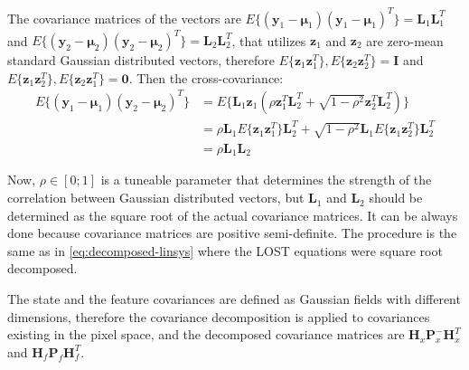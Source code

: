The covariance matrices of the vectors are $E\{(\mathbf{y}_1-\boldsymbol{\mu}_1)(\mathbf{y}_1-\boldsymbol{\mu}_1)^T\}=\mathbf{L}_1\mathbf{L}_1^T$ and $E\{(\mathbf{y}_2-\boldsymbol{\mu}_2)(\mathbf{y}_2-\boldsymbol{\mu}_2)^T\}=\mathbf{L}_2\mathbf{L}_2^T$, that utilizes $\mathbf{z}_1$ and $\mathbf{z}_2$ are zero-mean standard Gaussian distributed vectors, therefore $E\{\mathbf{z}_1\mathbf{z}_1^T\}, E\{\mathbf{z}_2\mathbf{z}_2^T\}=\mathbf{I}$ and $E\{\mathbf{z}_1\mathbf{z}_2^T\}, E\{\mathbf{z}_2\mathbf{z}_1^T\}=\mathbf{0}$. Then the cross-covariance:
\begin{equation}
\begin{aligned}    
    E\{(\mathbf{y}_1-\boldsymbol{\mu}_1)(\mathbf{y}_2-\boldsymbol{\mu}_2)^T\}&=E\{\mathbf{L}_1\mathbf{z}_1(\rho\mathbf{z}_1^T\mathbf{L}_2^T+\sqrt{1-\rho^2}\mathbf{z}_2^T\mathbf{L}_2^T)\} \\ &=
    \rho\mathbf{L}_1 E\{\mathbf{z}_1\mathbf{z}_1^T\}\mathbf{L}_2^T+\sqrt{1-\rho^2}\mathbf{L}_1E\{\mathbf{z}_1\mathbf{z}_2^T\}\mathbf{L}_2^T \\ &=
    \rho\mathbf{L}_1\mathbf{L}_2
\end{aligned}
\end{equation}

Now, $\rho\in[0;1]$ is a tuneable parameter that determines the strength of the correlation between Gaussian distributed vectors, but $\mathbf{L}_1$ and $\mathbf{L}_2$ should be determined as the square root of the actual covariance matrices. It can be always done because covariance matrices are positive semi-definite. The procedure is the same as in \eqref{eq:decomposed-linsys} where the LOST equations were square root decomposed.

The state and the feature covariances are defined as Gaussian fields with different dimensions, therefore the covariance decomposition is applied to covariances existing in the pixel space, and the decomposed covariance matrices are $\mathbf{H}_x\mathbf{P}_x^-\mathbf{H}_x^T$ and $\mathbf{H}_f\mathbf{P}_f\mathbf{H}_f^T$.